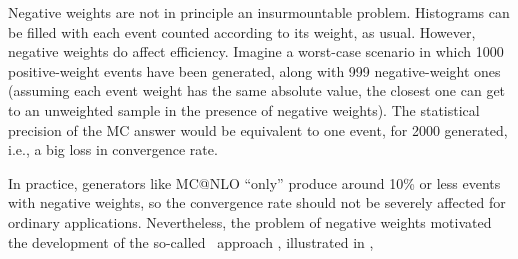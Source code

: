 Negative weights are not in principle an insurmountable
problem. Histograms can be filled with each event counted 
according to its weight, as usual. However, negative weights do affect
efficiency. Imagine a worst-case scenario in which 1000
positive-weight events have been generated, along with 999 negative-weight
ones (assuming each event weight has the same absolute value, the
closest one can get to an unweighted sample in the presence of
negative weights). 
The statistical precision of the MC answer would be equivalent
to one event, for 2000 generated, i.e., a big loss in convergence
rate. 

%
%
%
%
In practice, generators like MC@NLO ``only'' produce around 10\% or
less events with negative weights, so the convergence rate should not
be severely affected for ordinary applications. Nevertheless,  
the problem of negative weights 
motivated the development of the so-called \Pw\ approach 
\cite{Frixione:2007vw}, illustrated in , 
